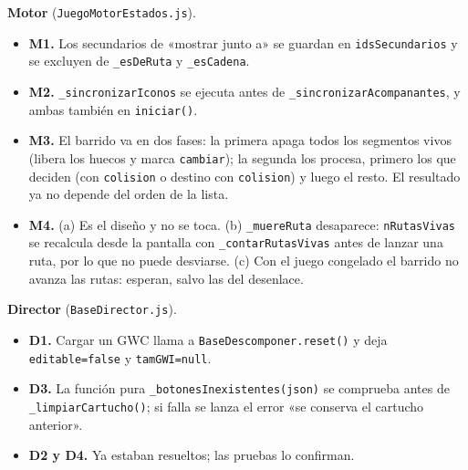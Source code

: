 \textbf{Motor} (\texttt{JuegoMotorEstados.js}).
\begin{itemize}
	\item \textbf{M1.} Los secundarios de «mostrar junto a» se guardan en \texttt{idsSecundarios} y se excluyen de \texttt{\_esDeRuta} y \texttt{\_esCadena}.
	\item \textbf{M2.} \texttt{\_sincronizarIconos} se ejecuta antes de \texttt{\_sincronizarAcompanantes}, y ambas también en \texttt{iniciar()}.
	\item \textbf{M3.} El barrido va en dos fases: la primera apaga todos los segmentos vivos (libera los huecos y marca \texttt{cambiar}); la segunda los procesa, primero los que deciden (con \texttt{colision} o destino con \texttt{colision}) y luego el resto. El resultado ya no depende del orden de la lista.
	\item \textbf{M4.} (a) Es el diseño y no se toca. (b) \texttt{\_muereRuta} desaparece: \texttt{nRutasVivas} se recalcula desde la pantalla con \texttt{\_contarRutasVivas} antes de lanzar una ruta, por lo que no puede desviarse. (c) Con el juego congelado el barrido no avanza las rutas: esperan, salvo las del desenlace.
\end{itemize}

\textbf{Director} (\texttt{BaseDirector.js}).
\begin{itemize}
	\item \textbf{D1.} Cargar un GWC llama a \texttt{BaseDescomponer.reset()} y deja \texttt{editable=false} y \texttt{tamGWI=null}.
	\item \textbf{D3.} La función pura \texttt{\_botonesInexistentes(json)} se comprueba antes de \texttt{\_limpiarCartucho()}; si falla se lanza el error «se conserva el cartucho anterior».
	\item \textbf{D2 y D4.} Ya estaban resueltos; las pruebas lo confirman.
\end{itemize}

